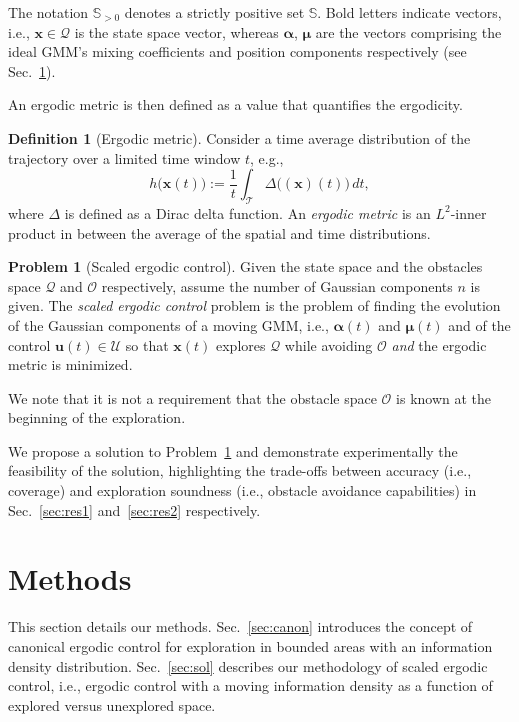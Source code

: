 \documentclass[letterpaper,10pt,conference,twoside]{IEEEtran}
\theoremstyle{definition}
\newtheorem{defn}{Definition}[section]
\newtheorem{pb}{Problem}[section]
\begin{document}
The notation $\mathbb{S}_{>0}$ denotes a strictly positive set $\mathbb{S}$. Bold letters indicate vectors, i.e., $\mathbf{x}\in\mathcal{Q}$ is the state space vector, whereas $\boldsymbol{\alpha}$, $\boldsymbol{\mu}$  are the vectors comprising the ideal GMM's mixing coefficients and position components respectively (see Sec.~\ref{sec:meth}).

An ergodic metric is then defined as a value that quantifies the ergodicity.
\begin{defn}[Ergodic metric]\label{def:ergomet}
  Consider a time average distribution of the trajectory over a limited time window $t$, e.g.,
  \begin{equation}
    h\big(\mathbf{x}(t)\big):=\frac{1}{t}\int_\mathcal{T}\Delta\big((\mathbf{x})(t)\big)\,dt,
  \end{equation}
  where $\Delta$ is defined as a Dirac delta function. An \textit{ergodic metric} is an $L^2$-inner product in between the average of the spatial and time distributions.
\end{defn}

\begin{pb}[Scaled ergodic control]\label{pb}
  Given the state space and the obstacles space $\mathcal{Q}$ and $\mathcal{O}$ respectively, assume the number of Gaussian components $n$ is given. The \textit{scaled ergodic control} problem is the problem of finding the evolution of the Gaussian components of a moving GMM, i.e., $\boldsymbol{\alpha}(t)$ and $\boldsymbol{\mu}(t)$ and of the control $\mathbf{u}(t)\in\mathcal{U}$ so that $\mathbf{x}(t)$ explores $\mathcal{Q}$ while avoiding $\mathcal{O}$ \textit{and} the ergodic metric is minimized.
\end{pb}

We note that it is not a requirement that the obstacle space $\mathcal{O}$ is known at the beginning of the exploration.

We propose a solution to Problem~\ref{pb} and demonstrate experimentally the feasibility of the solution, highlighting the trade-offs between accuracy (i.e., coverage) and exploration soundness (i.e., obstacle avoidance capabilities) in Sec.~\ref{sec:res1} and~\ref{sec:res2} respectively.


\section{Methods}\label{sec:meth}
\noindent
This section details our methods. Sec.~\ref{sec:canon} introduces the concept of canonical ergodic control for exploration in bounded areas with an information density distribution. Sec.~\ref{sec:sol} describes our methodology of scaled ergodic control, i.e., ergodic control with a moving information density as a function of explored versus unexplored space.
\end{document}
